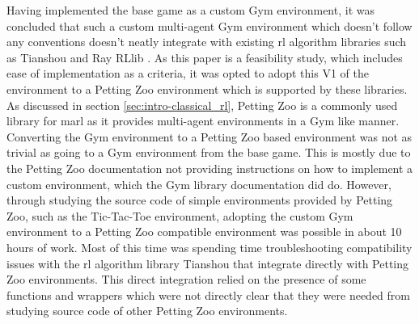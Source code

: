 Having implemented the base game as a custom Gym environment, it was concluded that such a custom multi-agent Gym environment which doesn't follow any conventions doesn't neatly integrate with existing \gls{rl} algorithm libraries such as Tianshou \citep{tianshou} and Ray RLlib \citep{rllib}.
As this paper is a feasibility study, which includes ease of implementation as a criteria, it was opted to adopt this V1 of the environment to a Petting Zoo environment which is supported by these libraries.
As discussed in section \ref{sec:intro-classical_rl}, Petting Zoo is a commonly used library for \gls{marl} as it provides multi-agent environments in a Gym like manner.
Converting the Gym environment to a Petting Zoo based environment was not as trivial as going to a Gym environment from the base game.
This is mostly due to the Petting Zoo documentation not providing instructions on how to implement a custom environment, which the Gym library documentation did do.
However, through studying the source code of simple environments provided by Petting Zoo, such as the Tic-Tac-Toe environment, adopting the custom Gym environment to a Petting Zoo compatible environment was possible in about 10 hours of work.
Most of this time was spending time troubleshooting compatibility issues with the \gls{rl} algorithm library Tianshou that integrate directly with Petting Zoo environments.
This direct integration relied on the presence of some functions and wrappers which were not directly clear that they were needed from studying source code of other Petting Zoo environments. 

